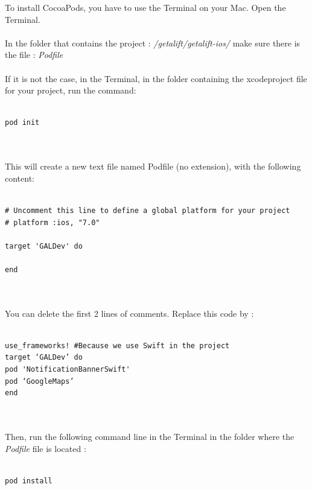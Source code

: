 To install CocoaPods, you have to use the Terminal on your Mac. Open the Terminal.
\\\\
In the folder that contains the project : \textit{/getalift/getalift-ios/} make sure there is the file : \textit{Podfile}
\\\\
If it is not the case, in the Terminal, in the folder containing the xcodeproject file for your project, run the command:
\\\\
\begin{DDbox}{\linewidth}
\begin{verbatim}
pod init
\end{verbatim}
\end{DDbox}
\\\\
This will create a new text file named Podfile (no extension), with the following content:
\\\\
\begin{DDbox}{\linewidth}
\begin{verbatim}
# Uncomment this line to define a global platform for your project
# platform :ios, "7.0"

target 'GALDev' do

end
\end{verbatim}
\end{DDbox}
\\\\
You can delete the first 2 lines of comments. Replace this code by :
\\\\
\begin{DDbox}{\linewidth}
\begin{verbatim}
use_frameworks! #Because we use Swift in the project
target ‘GALDev’ do 
pod 'NotificationBannerSwift'
pod ‘GoogleMaps’
end
\end{verbatim}
\end{DDbox}
\\\\
Then, run the following command line in the Terminal in the folder where the \textit{Podfile} file is located :
\\\\
\begin{DDbox}{\linewidth}
\begin{verbatim}
pod install
\end{verbatim}
\end{DDbox}
\clearpage
